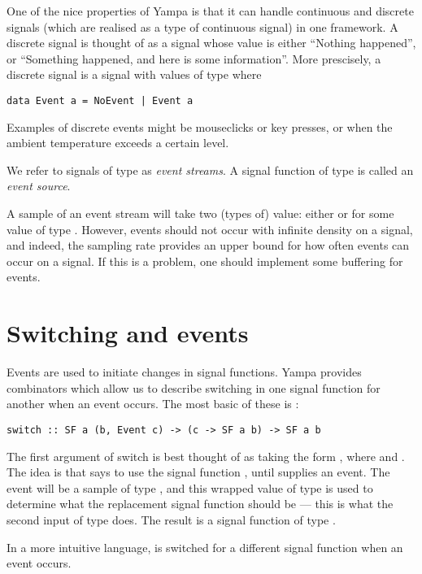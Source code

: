 One of the nice properties of Yampa is that it can handle continuous and discrete signals (which are realised as a type of continuous signal) in one framework. A discrete signal is thought of as a signal whose value is either ``Nothing happened'', or ``Something happened, and here is some information''. More prescisely, a discrete signal is a signal with values of type  where

\begin{lstlisting}
data Event a = NoEvent | Event a
\end{lstlisting}

Examples of discrete events might be mouseclicks or key presses, or when the ambient temperature exceeds a certain level.

We refer to signals of  type as \emph{event streams}. A signal function of type  is called an \emph{event source}.

A sample of an event stream will take two (types of) value: either  or  for some value of type . However, events should not occur with infinite density on a signal, and indeed, the sampling rate provides an upper bound for how often events can occur on a signal. If this is a problem, one should implement some buffering for events.

\section{Switching and events}

Events are used to initiate changes in signal functions. Yampa provides combinators which allow us to describe switching in one signal function for another when an event occurs. The most basic of these is :

\begin{lstlisting}
switch :: SF a (b, Event c) -> (c -> SF a b) -> SF a b
\end{lstlisting}

\noindent The first argument of switch is best thought of as taking the form , where  and . The idea is that  says to use the signal function , until  supplies an event. The event will be a sample of type , and this wrapped value of type  is used to determine what the replacement signal function should be --- this is what the second input of type  does. The result is a signal function of type .

In a more intuitive language,  is switched for a different signal function when an event occurs.
